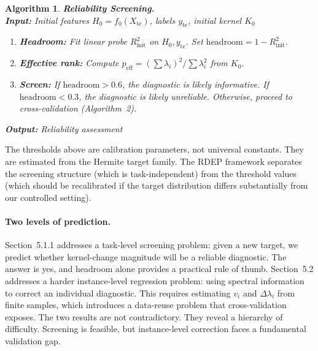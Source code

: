 \documentclass[twoside,11pt]{article}
\newtheorem{algorithm}{Algorithm}
\begin{document}
\begin{algorithm}
\label{alg:reliability}
\small
\textbf{Reliability Screening.} \\
\textbf{Input:} Initial features $H_0 = f_0(X_{\text{te}})$, labels $y_{\text{te}}$, initial kernel $K_0$

\begin{enumerate}
    \item \textbf{Headroom:} Fit linear probe $R^2_{\text{init}}$ on $H_0, y_{\text{te}}$. Set $\text{headroom} = 1 - R^2_{\text{init}}$.
    \item \textbf{Effective rank:} Compute $p_{\text{eff}} = (\sum \lambda_i)^2 / \sum \lambda_i^2$ from $K_0$.
    \item \textbf{Screen:} If $\text{headroom} > 0.6$, the diagnostic is likely informative. If $\text{headroom} < 0.3$, the diagnostic is likely unreliable. Otherwise, proceed to cross-validation (Algorithm~2).
\end{enumerate}
\textbf{Output:} Reliability assessment
\end{algorithm}

The thresholds above are calibration parameters, not universal constants. They are estimated from the Hermite target family. The RDEP framework separates the screening structure (which is task-independent) from the threshold values (which should be recalibrated if the target distribution differs substantially from our controlled setting).

\paragraph{Two levels of prediction.} Section~5.1.1 addresses a task-level screening problem: given a new target, we predict whether kernel-change magnitude will be a reliable diagnostic. The answer is yes, and headroom alone provides a practical rule of thumb. Section~5.2 addresses a harder instance-level regression problem: using spectral information to correct an individual diagnostic. This requires estimating $v_i$ and $\Delta\lambda_i$ from finite samples, which introduces a data-reuse problem that cross-validation exposes. The two results are not contradictory. They reveal a hierarchy of difficulty. Screening is feasible, but instance-level correction faces a fundamental validation gap.
\end{document}
